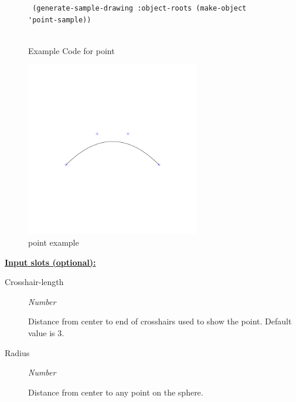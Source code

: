 \documentclass [11pt]{book}
\begin{document}
\begin{itemize}
\begin{figure}
\begin{lrbox}{\boxedverb}
\begin{minipage}{\linewidth}
{\begin{verbatim}
 (generate-sample-drawing :object-roots (make-object 'point-sample))


\end{verbatim}}
\end{minipage}
\end{lrbox}
\fbox{\usebox{\boxedverb}}

\caption{Example Code for point}

\label{fig:example-code-point}

\end{figure}

\begin{figure}
\begin{center}
\includegraphics[width=3in,height=3in]{../images/example-point.pdf}
\end{center}

\caption{point example}

\label{fig:point}

\end{figure}





\textbf{
\underline{Input slots (optional):}}

\begin{description}

\item [Crosshair-length]
\emph{Number}

 Distance from center to end of crosshairs used to show the point. Default value is 3.




\item [Radius]
\emph{Number}

 Distance from center to any point on the sphere.





\end{description}
\end{itemize}
\end{document}
